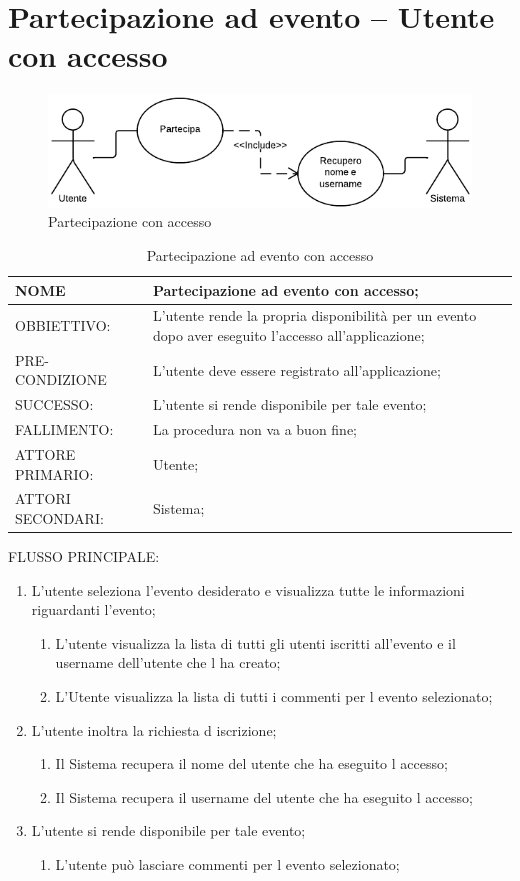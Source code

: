 \section{Partecipazione ad evento – Utente con accesso}
\begin{figure}[h!]
\centering
\includegraphics[scale=0.60]{img/use/PartecipaCa.png}
\caption{Partecipazione con accesso}
\label{fig:ParteCA}
\end{figure}
\begin{table}[H]
\begin{tabular}{p{}|p{}}
\toprule
NOME & Partecipazione ad evento con accesso;\\
\hline
OBBIETTIVO: & L'utente rende la propria disponibilità per un evento dopo aver eseguito l'accesso all'applicazione;\\
\hline
PRE-CONDIZIONE & L'utente deve essere registrato all'applicazione;\\
\hline
SUCCESSO: & L'utente si rende disponibile per tale evento;\\
\hline
FALLIMENTO: & La procedura non va a buon fine;\\
\hline
ATTORE PRIMARIO: & Utente;\\
\hline
ATTORI SECONDARI: & Sistema;\\
\bottomrule
\end{tabular}
\caption{Partecipazione ad evento con accesso}
\label{table:par2}
\end{table}
FLUSSO PRINCIPALE:
\begin{enumerate}
\item L'utente seleziona l'evento desiderato e visualizza tutte le informazioni riguardanti l'evento;
\begin{enumerate}
\item L'utente visualizza la lista di tutti gli utenti iscritti all'evento e il username dell'utente che l ha creato;
\item L'Utente visualizza la lista di tutti i commenti per l evento selezionato;
\end{enumerate}
\item L'utente inoltra la richiesta d iscrizione;
\begin{enumerate}
\item Il Sistema recupera il nome del utente che ha eseguito l accesso;
\item Il Sistema recupera il username del utente che ha eseguito l accesso;
\end{enumerate}
\item L'utente si rende disponibile per tale evento;
\begin{enumerate}
\item L'utente può lasciare commenti per l evento selezionato;
\end{enumerate}
\end{enumerate}

